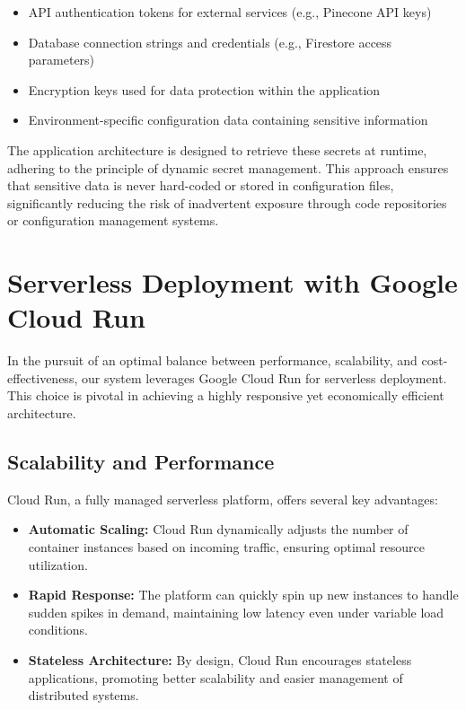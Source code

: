 \documentclass[a4paper, 12pt]{report}
\begin{document}
\begin{itemize}
    \item API authentication tokens for external services (e.g., Pinecone API keys)
    \item Database connection strings and credentials (e.g., Firestore access parameters)
    \item Encryption keys used for data protection within the application
    \item Environment-specific configuration data containing sensitive information
\end{itemize}

The application architecture is designed to retrieve these secrets at runtime, adhering to the principle of dynamic secret management. This approach ensures that sensitive data is never hard-coded or stored in configuration files, significantly reducing the risk of inadvertent exposure through code repositories or configuration management systems.


\section{Serverless Deployment with Google Cloud Run}

In the pursuit of an optimal balance between performance, scalability, and cost-effectiveness, our system leverages Google Cloud Run for serverless deployment. This choice is pivotal in achieving a highly responsive yet economically efficient architecture.

\subsection{Scalability and Performance}
Cloud Run, a fully managed serverless platform, offers several key advantages:

\begin{itemize}
    \item \textbf{Automatic Scaling:} Cloud Run dynamically adjusts the number of container instances based on incoming traffic, ensuring optimal resource utilization.
    \item \textbf{Rapid Response:} The platform can quickly spin up new instances to handle sudden spikes in demand, maintaining low latency even under variable load conditions.
    \item \textbf{Stateless Architecture:} By design, Cloud Run encourages stateless applications, promoting better scalability and easier management of distributed systems.
\end{itemize}
\end{document}
